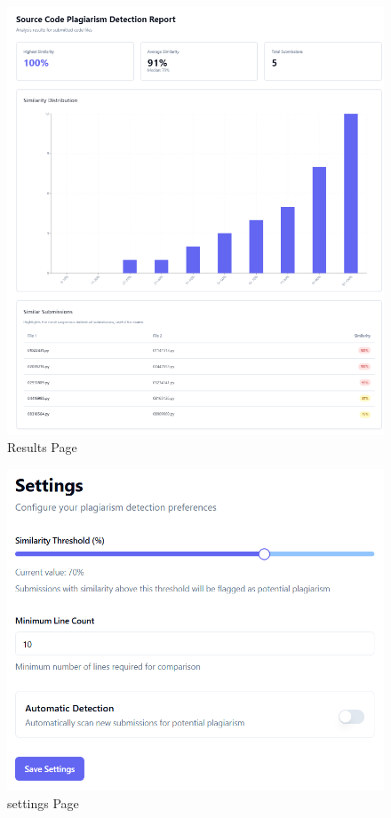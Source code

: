\documentclass[12pt, titlepage]{article}
\begin{document}
\begin{figure}[H]
  \centering
  \includegraphics[width=\textwidth]{results.png}
  \caption{Results Page}
  \label{fig:results}
\end{figure}

\begin{figure}[H]
  \centering
  \includegraphics[width=\textwidth]{settings.png}
  \caption{settings Page}
  \label{fig:results}
\end{figure}
\end{document}
